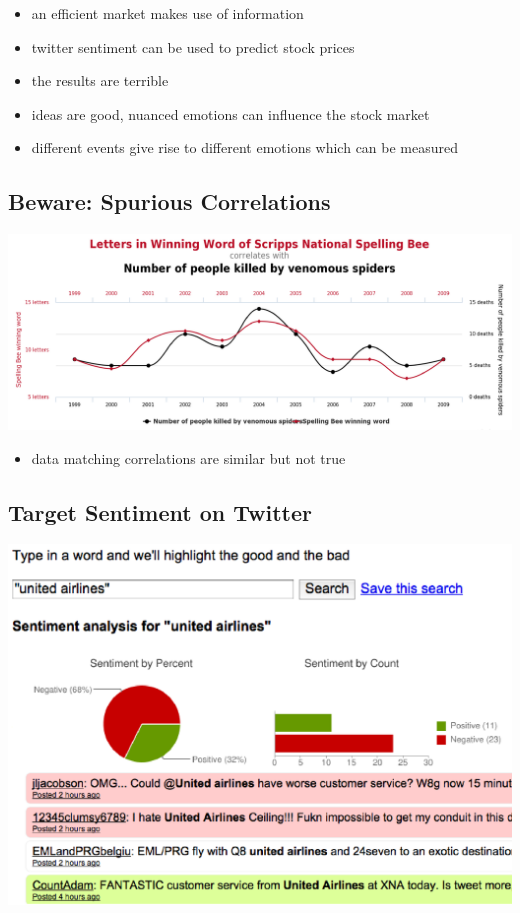 \documentclass[11pt]{article}
\theoremstyle{definition}
\begin{document}
\begin{itemize}
  \item an efficient market makes use of information
  \item twitter sentiment can be used to predict stock prices
  \item the results are terrible
  \item ideas are good, nuanced emotions can influence the stock market
  \item different events give rise to different emotions which can be measured
\end{itemize}

\subsection{Beware: Spurious Correlations}
\includegraphics[width=\textwidth]{10.png}
\begin{itemize}
  \item data matching correlations are similar but not true
\end{itemize}

\subsection{Target Sentiment on Twitter}
\includegraphics[width=\textwidth/2]{11.png}
\end{document}
